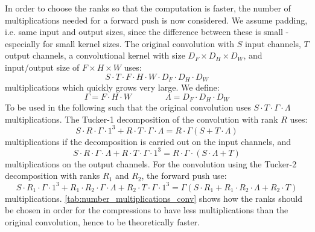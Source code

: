 In order to choose the ranks so that the computation is faster, the number of multiplications needed for a forward push is now considered. We assume padding, i.e. same input and output sizes, since the difference between these is small - especially for small kernel sizes. The original convolution with $S$ input channels, $T$ output channels, a convolutional kernel with size $D_F\times D_H \times D_W$, and input/output size of $F\times H \times W$ uses:
\begin{equation}
    S \cdot T \cdot F \cdot H \cdot W \cdot D_F \cdot D_H \cdot D_W
\end{equation}
multiplications which quickly grows very large. We define:
\begin{equation}
    \Gamma = F \cdot H \cdot W \qquad \qquad \Lambda = D_F \cdot D_H \cdot D_W
    \label{eq:lambda_gamma_definition}
\end{equation}
To be used in the following such that the original convolution uses $S\cdot T \cdot \Gamma \cdot \Lambda$ multiplications. The Tucker-1 decomposition of the convolution with rank $R$ uses:
\begin{equation}
S \cdot R \cdot \Gamma \cdot 1^3 + R\cdot T \cdot \Gamma \cdot \Lambda = R\cdot \Gamma \left( S + T\cdot \Lambda \right)
\end{equation}
multiplications if the decomposition is carried out on the input channels, and
\begin{equation}
    S \cdot R \cdot \Gamma \cdot \Lambda + R \cdot T \cdot \Gamma \cdot 1^3 = R \cdot \Gamma \cdot \left( S \cdot \Lambda + T \right)
\end{equation}
multiplications on the output channels. For the convolution using the Tucker-2 decomposition with ranks $R_1$ and $R_2$, the forward push use:
\begin{equation}
    S\cdot R_1 \cdot \Gamma \cdot 1^3 + R_1 \cdot R_2 \cdot \Gamma \cdot \Lambda + R_2 \cdot T \cdot \Gamma \cdot 1^3 = \Gamma \left( S\cdot R_1 + R_1\cdot R_2 \cdot \Lambda + R_2\cdot T \right)
\end{equation}
multiplications. \autoref{tab:number_multiplications_conv} shows how the ranks should be chosen in order for the compressions to have less multiplications than the original convolution, hence to be theoretically faster.

